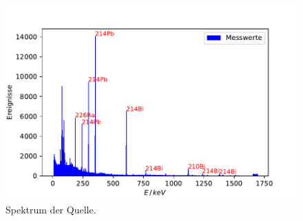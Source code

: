 \begin{figure}[H]
  \centering
  \includegraphics[width=.7\textwidth]{../Plots/U_Spektrum.pdf}
  \caption{Spektrum der  Quelle.}
  \label{fig:U_Spektrum}
\end{figure}
